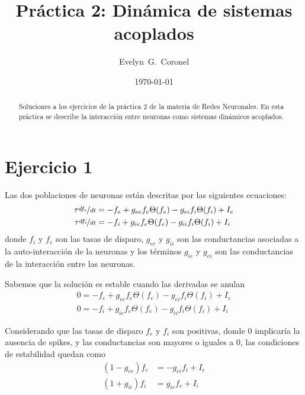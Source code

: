 
\usepackage{hyperref}


\title{Práctica 2: Dinámica de sistemas acoplados }
\author{Evelyn~G.~Coronel}


\date[]{\lowercase{\today}} %

\begin{abstract}
Soluciones a los ejercicios de la práctica 2 de la materia de Redes Neuronales. En esta práctica se describe  la interacción entre neuronas como sistemas dinámicos acoplados.
\end{abstract} 
\maketitle

\section*{Ejercicio 1}

Las dos poblaciones de neuronas están descritas por las siguientes ecuaciones:
\begin{align}
    \tau \nicefrac{df_e}{dt} &= -f_e + g_{ee} f_e\Theta(f_e) - g_{ei}f_i\Theta(f_i) + I_e\\
    \tau \nicefrac{df_i}{dt} &= -f_i + g_{ie} f_e\Theta(f_e) - g_{ii}f_i\Theta(f_i) + I_i
\end{align}
donde $f_i$ y $f_e$ son las tasas de disparo, $g_{ee}$ y $g_{ii}$ son las conductancias asociadas a la auto-interacción de la neuronas y los términos $g_{ie}$ y $g_{ei}$ son las conductancias de la interacción entre las neuronas.

Sabemos que la solución es estable cuando las derivadas se anulan
\begin{align}
    0= -f_e + g_{ee} f_e\Theta(f_e) - g_{ei}f_i\Theta(f_i) + I_e\\
    0= -f_i + g_{ie} f_e\Theta(f_e) - g_{ii}f_i\Theta(f_i) + I_i
\end{align}

Considerando que las tasas de disparo $f_e$ y $f_i$ son positivas, donde $0$ implicaría la ausencia de spikes, y las conductancias  son mayores o iguales a 0,  las condiciones de estabilidad quedan como
\begin{align}
     (1 -g_{ee}) f_e &= -g_{ei}f_i + I_e \label{fe}\\
    (1 + g_{ii}) f_i &=  g_{ie} f_e  + I_i
\end{align}

